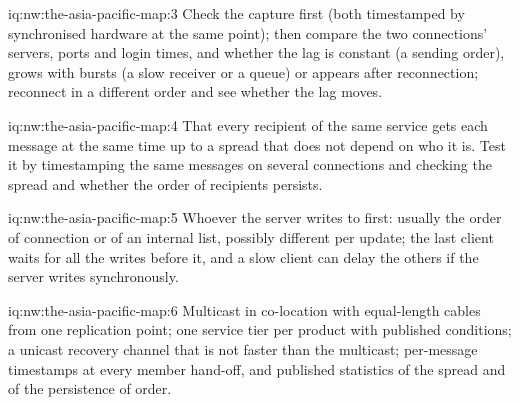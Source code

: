 \begin{solution}{iq:nw:the-asia-pacific-map:3}
Check the capture first (both timestamped by synchronised hardware at the same point); then compare the two connections' servers, ports and
login times, and whether the lag is constant (a sending order), grows with bursts (a slow receiver or a queue) or appears after reconnection;
reconnect in a different order and see whether the lag moves.
\end{solution}

\begin{solution}{iq:nw:the-asia-pacific-map:4}
That every recipient of the same service gets each message at the same time up to a spread that does not depend on who it is. Test it by
timestamping the same messages on several connections and checking the spread and whether the order of recipients persists.
\end{solution}

\begin{solution}{iq:nw:the-asia-pacific-map:5}
Whoever the server writes to first: usually the order of connection or of an internal list, possibly different per update; the last client
waits for all the writes before it, and a slow client can delay the others if the server writes synchronously.
\end{solution}

\begin{solution}{iq:nw:the-asia-pacific-map:6}
Multicast in co-location with equal-length cables from one replication point; one service tier per product with published conditions; a
unicast recovery channel that is not faster than the multicast; per-message timestamps at every member hand-off, and published statistics of
the spread and of the persistence of order.
\end{solution}
